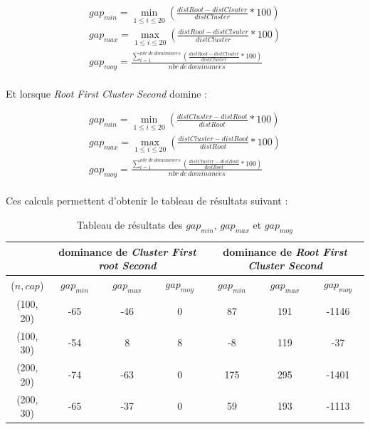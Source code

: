 \documentclass[twoside,UTF8]{EPURapport}
\begin{document}
\begin{align}
gap_{min} = \min_{1 \leqslant i \leqslant 20}(\frac{distRoot - distClsuter}{distCluster} * 100) \\
gap_{max} = \max_{1 \leqslant i \leqslant 20}(\frac{distRoot - distClsuter}{distCluster} * 100) \\
gap_{moy} = \frac{\displaystyle\sum_{i=1}^{nbr\, de\, dominances}(\frac{distRoot - distClsuter}{distCluster} * 100)}{nbr\, de\, dominances}
\end{align}

\paragraph{}
Et lorsque \textit{Root First Cluster Second} domine : 

\begin{align}
gap_{min} = \min_{1 \leqslant i \leqslant 20}(\frac{distCluster - distRoot}{distRoot} * 100) \\
gap_{max} = \max_{1 \leqslant i \leqslant 20}(\frac{distCluster - distRoot}{distRoot} * 100) \\
gap_{moy} = \frac{\displaystyle\sum_{i=1}^{nbr\, de\, dominances}(\frac{distCluster - distRoot}{distRoot} * 100)}{nbr\, de\, dominances}
\end{align}

\paragraph{}
Ces calculs permettent d'obtenir le tableau de résultats suivant : 

\begin{table}[H]
\centering
\begin{tabular}{|c|c|c|c|c|c|c|}
\hline
 & \multicolumn{3}{c|}{dominance de \textit{Cluster First root Second}} & \multicolumn{3}{c|}{dominance de \textit{Root First Cluster Second}} \\ 
\hline 
($n, cap$) & $gap_{min}$ & $gap_{max}$ & $gap_{moy}$ & $gap_{min}$ & $gap_{max}$ & $gap_{moy}$ \\ 
\hline 
(100, 20) & -65 & -46 & 0 & 87 & 191 & -1146 \\ 
\hline 
(100, 30) & -54 & 8 & 8 & -8 & 119 & -37 \\ 
\hline 
(200, 20) & -74 & -63 & 0 & 175 & 295 & -1401 \\ 
\hline 
(200, 30) & -65 & -37 & 0 & 59 & 193 & -1113 \\ 
\hline 
\end{tabular} 
\caption{Tableau de résultats des $gap_{min}$, $gap_{max}$ et $gap_{moy}$} 
\end{table}
\end{document}
